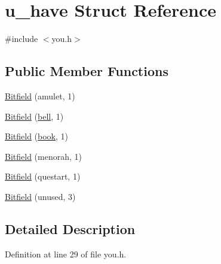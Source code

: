 \hypertarget{structu__have}{\section{u\+\_\+have Struct Reference}
\label{structu__have}
}


{\ttfamily \#include $<$you.\+h$>$}

\subsection*{Public Member Functions}
\begin{DoxyCompactItemize}
\item 
\hyperlink{structu__have_abd51deeabd4f3c4af8cb1c666fc22383}{Bitfield} (amulet, 1)
\item 
\hyperlink{structu__have_a0c91304d6fd92609bb8674384f1a5e4b}{Bitfield} (\hyperlink{winproto_8h_aa5da7dc4719848ae9157b977c1e1db71}{bell}, 1)
\item 
\hyperlink{structu__have_aba43fd814625ded2f6395ae32148e9f8}{Bitfield} (\hyperlink{spell_8c_a9e7bd244f8be2c345cf25019b954e507}{book}, 1)
\item 
\hyperlink{structu__have_a1f8bdf80687051f98abe94205cd7b85a}{Bitfield} (menorah, 1)
\item 
\hyperlink{structu__have_aa5185b22d6b04b02d87d8f56c768b2e4}{Bitfield} (questart, 1)
\item 
\hyperlink{structu__have_a85fd745b958e407db8f6cacbe76fdfad}{Bitfield} (unused, 3)
\end{DoxyCompactItemize}


\subsection{Detailed Description}


Definition at line 29 of file you.\+h.



